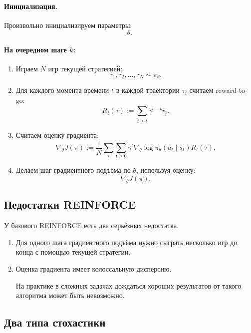 \documentclass[12pt,a4paper]{article}
\begin{document}
\paragraph{Инициализация.}

Произвольно инициализируем параметры:
\[
\theta.
\]

\paragraph{На очередном шаге $k$:}

\begin{enumerate}
    \item Играем $N$ игр текущей стратегией:
    \[
    \tau_1,\tau_2,\ldots,\tau_N
    \sim
    \pi_\theta.
    \]

    \item Для каждого момента времени $t$ в каждой траектории $\tau_i$ считаем reward-to-go:
    \[
    R_t(\tau)
    :=
    \sum_{\hat t\ge t}
    \gamma^{\hat t-t}
    r_{\hat t}.
    \]

    \item Считаем оценку градиента:
    \[
    \nabla_\theta J(\pi)
    :=
    \frac{1}{N}
    \sum_{\tau}
    \sum_{t\ge 0}
    \gamma^t
    \nabla_\theta
    \log \pi_\theta(a_t\mid s_t)
    R_t(\tau).
    \]

    \item Делаем шаг градиентного подъёма по $\theta$, используя оценку:
    \[
    \nabla_\theta J(\pi).
    \]
\end{enumerate}

\subsection{Недостатки REINFORCE}

У базового REINFORCE есть два серьёзных недостатка.

\begin{enumerate}
    \item Для одного шага градиентного подъёма нужно сыграть несколько игр до конца с помощью текущей стратегии.

    \item Оценка градиента имеет колоссальную дисперсию.

    На практике в сложных задачах дождаться хороших результатов от такого алгоритма может быть невозможно.
\end{enumerate}

\subsection{Два типа стохастики}
\end{document}
